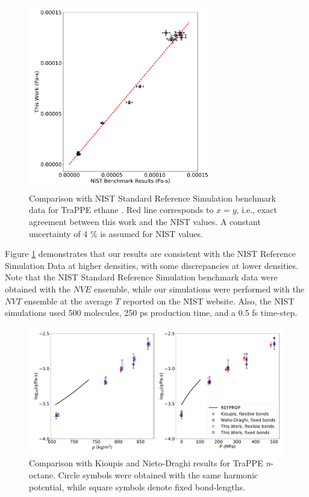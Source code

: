 \documentclass[preprint,review,11pt]{elsarticle}
\begin{document}
	
	\begin{figure}[htb!]
		\centering
		\includegraphics[width=3.2in]{NIST_ethane_TraPPE_validation.pdf}
		\caption{Comparison with NIST Standard Reference Simulation benchmark data for TraPPE ethane \cite{NIST_SRSW}. Red line corresponds to $x = y$, i.e., exact agreement between this work and the NIST values. A constant uncertainty of 4 \% is assumed for NIST values.}
		\label{fig:validation_runs}
	\end{figure} 
	
	Figure \ref{fig:validation_runs} demonstrates that our results are consistent with the NIST Reference Simulation Data at higher densities, with some discrepancies at lower densities. Note that the NIST Standard Reference Simulation benchmark data were obtained with the $NVE$ ensemble, while our simulations were performed with the $NVT$ ensemble at the average $T$ reported on the NIST website. Also, the NIST simulations used 500 molecules, 250 ps production time, and a 0.5 fs time-step.  
	
	\begin{figure}[htb!]
		\centering
		\includegraphics[width=6.4in]{validation_TraPPE_octane.pdf}
		\caption{Comparison with Kioupis \cite{Kioupis2000} and Nieto-Draghi \cite{Nieto2006} results for TraPPE \textit{n}-octane. Circle symbols were obtained with the same harmonic potential, while square symbols denote fixed bond-lengths.}
		\label{fig:validation_runs2}
	\end{figure}
	
\end{document}
